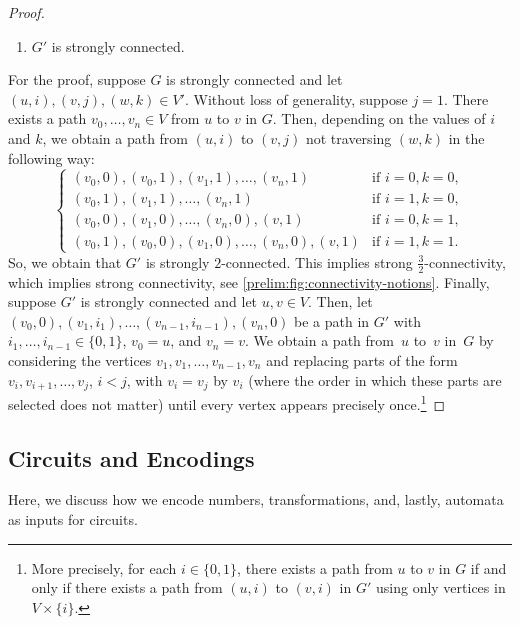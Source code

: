 \begin{proof}
\begin{enumerate}
		\item  $G'$ is strongly connected.
	\end{enumerate}
	For the proof, suppose $G$ is strongly connected and let $(u, i), (v, j), (w, k) \in V'$.
	Without loss of generality, suppose $j = 1$.
	There exists a path $v_0, \ldots, v_n \in V$ from $u$ to $v$ in $G$.
	Then, depending on the values of $i$ and $k$,
	we obtain a path from $(u, i)$ to $(v, j)$
	not traversing $(w, k)$ in the following way:
	\[
	\begin{cases}
		(v_0, 0), (v_0, 1), (v_1, 1), \ldots, (v_n, 1) & \text{if } i = 0, k = 0, \\
		(v_0, 1), (v_1, 1), \ldots, (v_n, 1)        & \text{if } i = 1, k = 0, \\
		(v_0, 0), (v_1, 0), \ldots, (v_n, 0), (v,1) & \text{if } i = 0, k = 1, \\
		(v_0, 1), (v_0, 0), (v_1, 0), \ldots, (v_n, 0), (v,1) & \text{if } i = 1, k = 1.  
	\end{cases}
	\]
	So, we obtain that $G'$ is strongly $2$-connected.
	This implies strong $\frac{3}{2}$-connectivity, which implies strong connectivity, see \cref{prelim:fig:connectivity-notions}.
	Finally, suppose $G'$ is strongly connected
	and let $u,v \in V$. Then, let $(v_0, 0), (v_1, i_1), \ldots, (v_{n-1}, i_{n-1}), (v_n, 0)$
	be a path in $G'$ with $i_1, \ldots, i_{n-1} \in \{0,1\}$, $v_0 = u$, and $v_n = v$.
	We obtain a path from~$u$ to~$v$ in~$G$
	by considering the vertices $v_1, v_1, \ldots, v_{n-1}, v_n$
	and replacing parts of the form $v_i, v_{i+1}, \ldots, v_j$, $i < j$,
	with $v_i = v_j$ by $v_i$ (where the order in which these parts are selected does not matter)
	until every vertex appears precisely once.\footnote{More precisely, for each $i \in \{0,1\}$,
		there exists a path
		from $u$ to $v$ in $G$ if and only if there
		exists a path from $(u, i)$ to $(v, i)$ in $G'$ using only vertices in $V \times \{i\}$.}
\end{proof}

\subsection{Circuits and Encodings}
\label{prelim:sec:encodings}

Here, we discuss how we encode numbers, transformations, and, lastly, automata
as inputs for circuits.

